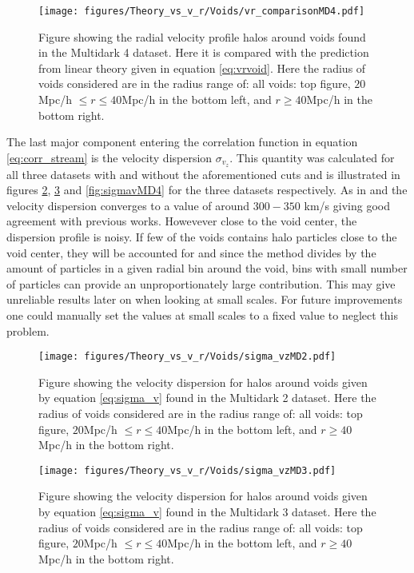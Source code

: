 \begin{figure}[htbp]\label{fig:vrMD4}
    \texttt{[image: figures/Theory\_vs\_v\_r/Voids/vr\_comparisonMD4.pdf]}
    \caption{Figure showing the radial velocity profile halos around voids found in the Multidark 4 dataset. Here it is compared with the prediction from linear theory given in equation \ref{eq:vrvoid}. Here the radius of voids considered are in the radius range of: all voids: top figure, $20$Mpc/h $\leq r\leq 40$Mpc/h in the bottom left, and $r\geq 40$Mpc/h in the bottom right.}
\end{figure}
The last major component entering the correlation function in equation \ref{eq:corr_stream} is the velocity dispersion $\sigma_{v_z}$. This quantity was calculated for all three datasets with and without the aforementioned cuts and is illustrated in figures \ref{fig:sigmavMD2}, \ref{fig:sigmavMD3} and \ref{fig:sigmavMD4} for the three datasets respectively. As in \cite{Nadathur_corr} and \cite{Achitouv_streaming} the velocity dispersion converges to a value of around $300-350$ km/s giving good agreement with previous works. Howevever close to the void center, the dispersion profile is noisy. If few of the voids contains halo particles close to the void center, they will be accounted for and since the method divides by the amount of particles in a given radial bin around the void, bins with small number of particles can provide an unproportionately large contribution. This may give unreliable results later on when looking at small scales. For future improvements one could manually set the values at small scales to a fixed value to neglect this problem.
\begin{figure}[htbp]\label{fig:sigmavMD2}
    \texttt{[image: figures/Theory\_vs\_v\_r/Voids/sigma\_vzMD2.pdf]}
    \caption{Figure showing the velocity dispersion for halos around voids given by equation \ref{eq:sigma_v} found in the Multidark 2 dataset. Here the radius of voids considered are in the radius range of: all voids: top figure, $20$Mpc/h $\leq r\leq 40$Mpc/h in the bottom left, and $r\geq 40$Mpc/h in the bottom right.}
\end{figure}

\begin{figure}[htbp]\label{fig:sigmavMD3}
    \texttt{[image: figures/Theory\_vs\_v\_r/Voids/sigma\_vzMD3.pdf]}
    \caption{Figure showing the velocity dispersion for halos around voids given by equation \ref{eq:sigma_v} found in the Multidark 3 dataset. Here the radius of voids considered are in the radius range of: all voids: top figure, $20$Mpc/h $\leq r\leq 40$Mpc/h in the bottom left, and $r\geq 40$Mpc/h in the bottom right.}
\end{figure}

